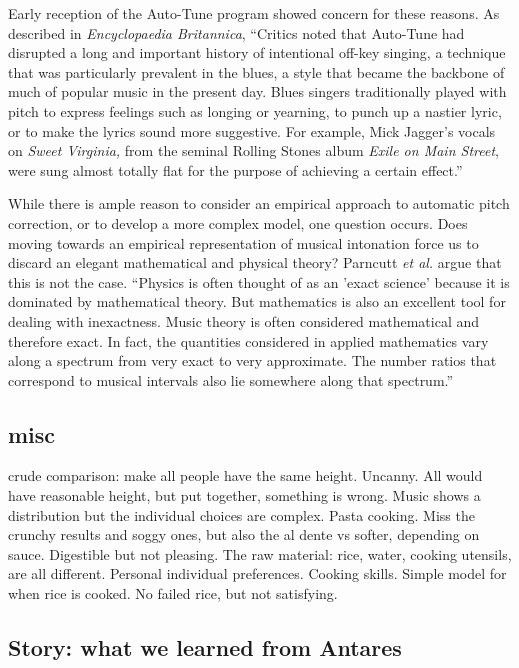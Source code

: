 Early reception of the Auto-Tune program showed concern for these reasons. As described in \textit{Encyclopaedia Britannica}, ``Critics noted that Auto-Tune had disrupted a long and important history of intentional off-key singing, a technique that was particularly prevalent in the blues, a style that became the backbone of much of popular music in the present day. Blues singers traditionally played with pitch to express feelings such as longing or yearning, to punch up a nastier lyric, or to make the lyrics sound more suggestive. For example, Mick Jagger’s vocals on \textit{Sweet Virginia,} from the seminal Rolling Stones album \textit{Exile on Main Street}, were sung almost totally flat for the purpose of achieving a certain effect.'' \cite{autotuneBritannica}
 
While there is ample reason to consider an empirical approach to automatic pitch correction, or to develop a more complex model, one question occurs. Does moving towards an empirical representation of musical intonation force us to discard an elegant mathematical and physical theory? Parncutt \textit{et al.} argue that this is not the case. ``Physics is often thought of as an 'exact science' because it is dominated by mathematical theory. But mathematics is also an excellent tool for dealing with inexactness. Music theory is often considered mathematical and therefore exact. In fact, the quantities considered in applied mathematics vary along a spectrum from very exact to very approximate. The number ratios that correspond to musical intervals also lie somewhere along that spectrum.''

\subsection{misc}

crude comparison: make all people have the same height. Uncanny. All would have reasonable height, but put together, something is wrong. Music shows a distribution but the individual choices are complex. Pasta cooking. Miss the crunchy results and soggy ones, but also the al dente vs softer, depending on sauce. Digestible but not pleasing. The raw material: rice, water, cooking utensils, are all different. Personal individual preferences. Cooking skills. Simple model for when rice is cooked. No failed rice, but not satisfying.

\subsection{Story: what we learned from Antares}

